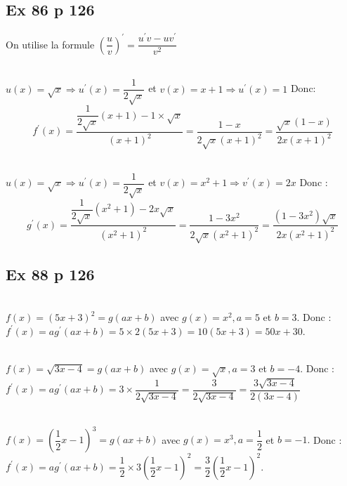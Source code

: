 \documentclass[12pt,a4paper]{book}
\begin{document}
\subsection*{Ex 86 p 126}
On utilise la formule $\left(\dfrac{u}{v}\right)^{\prime}=\dfrac{u^{\prime} v-u v^{\prime}}{v^{2}}$
\begin{enumMet}
    \item {}\\
$u(x)=\sqrt{x} \Rightarrow u^{\prime}(x)=\dfrac{1}{2 \sqrt{x}}$ et $v(x)=x+1 \Rightarrow u^{\prime}(x)=1$
Donc:\\
$$f^{\prime}(x)=\dfrac{\dfrac{1}{2 \sqrt{x}}(x+1)-1 \times \sqrt{x}}{(x+1)^{2}}=\dfrac{1-x}{2 \sqrt{x}(x+1)^{2}}=\dfrac{\sqrt{x}(1-x)}{2 x(x+1)^{2}}$$
    \item {}\\
$u(x)=\sqrt{x} \Rightarrow u^{\prime}(x)=\dfrac{1}{2 \sqrt{x}}$ et $v(x)=x^{2}+1 \Rightarrow v^{\prime}(x)=2 x$
Donc :\\
$$g^{\prime}(x)=\dfrac{\dfrac{1}{2 \sqrt{x}}\left(x^{2}+1\right)-2 x \sqrt{x}}{\left(x^{2}+1\right)^{2}}=\dfrac{1-3 x^{2}}{2 \sqrt{x}\left(x^{2}+1\right)^{2}}=\dfrac{\left(1-3 x^{2}\right) \sqrt{x}}{2 x\left(x^{2}+1\right)^{2}}$$
\end{enumMet}

\subsection*{Ex 88 p 126}

\begin{enumMet}
    \item {}\\
    $f(x)=(5 x+3)^{2}=g(a x+b)$ avec $g(x)=x^{2}, a=5$ et $b=3$. Donc : \\
    $f^{\prime}(x)=a g^{\prime}(a x+b)=5 \times 2(5 x+3)=10(5 x+3)=50 x+30$. 
\item {}\\
$f(x)=\sqrt{3 x-4}=g(a x+b)$ avec $g(x)=\sqrt{x}, a=3$ et $b=-4$.
Donc : \\
$f^{\prime}(x)=a g^{\prime}(a x+b)=3 \times \dfrac{1}{2 \sqrt{3 x-4}}=\dfrac{3}{2 \sqrt{3 x-4}}=\dfrac{3 \sqrt{3 x-4}}{2(3 x-4)}$
\item {}\\
$f(x)=\left(\dfrac{1}{2} x-1\right)^{3}=g(a x+b)$ avec $g(x)=x^{3}, a=\dfrac{1}{2}$ et $b=-1 .$ Donc : \\
$f^{\prime}(x)=a g^{\prime}(a x+b)=\dfrac{1}{2} \times 3\left(\dfrac{1}{2} x-1\right)^{2}=\dfrac{3}{2}\left(\dfrac{1}{2} x-1\right)^{2}$.
\end{enumMet}
\end{document}
